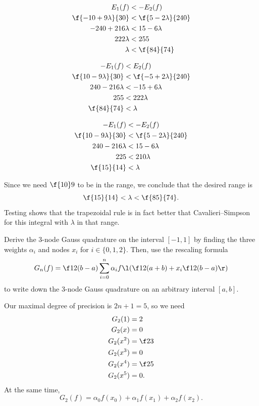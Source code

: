 \documentclass[a4paper]{article}
\begin{document}
\begin{align*}
E_1(f) &< -E_2(f) \\
\f{-10 + 9 \lambda}{30} &< \f{5 - 2 \lambda}{240} \\
-240 + 216 \lambda &< 15 - 6 \lambda \\
222 \lambda &< 255 \\
\lambda &< \f{84}{74}
\end{align*}

\begin{align*}
-E_1(f) &< E_2(f) \\
\f{10 - 9 \lambda}{30} &< \f{-5 + 2 \lambda}{240} \\
240 - 216 \lambda &< -15 + 6 \lambda \\
255 &< 222 \lambda \\
\f{84}{74} &< \lambda
\end{align*}

\begin{align*}
-E_1(f) &< -E_2(f) \\
\f{10 - 9 \lambda}{30} &< \f{5 - 2 \lambda}{240} \\
240 - 216 \lambda &< 15 - 6 \lambda \\
225 &< 210 \lambda \\
\f{15}{14} &< \lambda
\end{align*}

Since we need $\f{10}9$ to be in the range, we conclude that the desired range is \[
\f{15}{14} < \lambda < \f{85}{74}.
\] Testing shows that the trapezoidal rule is in fact better that Cavalieri--Simpson for this integral with $\lambda$ in that range. %



\begin{questionbody}
Derive the 3-node Gauss quadrature on the interval $[-1, 1]$ by finding the three weights $\alpha_i$ and nodes $x_i$ for $i \in \{0, 1, 2\}$. Then, use the rescaling formula \[
G_n(f) = \f12 (b - a) \sum_{i=0}^n \alpha_i f\l( \f12 (a + b) + x_i \f12 (b - a) \r)
\] to write down the 3-node Gauss quadrature on an arbitrary interval $[a, b]$.
\end{questionbody}

Our maximal degree of precision is $2n + 1 = 5$, so we need
\begin{align*}
G_2(1) &= 2 \\
G_2(x) &= 0 \\
G_2(x^2) &= \f23 \\
G_2(x^3) &= 0 \\
G_2(x^4) &= \f25 \\
G_2(x^5) &= 0.
\end{align*}
At the same time, \[
G_2(f) = \alpha_0 f(x_0) + \alpha_1 f(x_1) + \alpha_2 f(x_2).
\]
\end{document}
